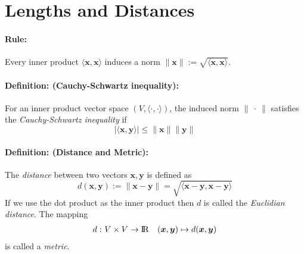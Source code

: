 \documentclass[12pt]{article}
\newcommand{\R}{{\rm I\!R}}
\newcommand{\bx}{{\bm{x}}}
\newcommand{\by}{{\bm{y}}}
\newcommand{\0}[0]{\bm{0}}
\newcommand{\ipr}[1]{\langle #1 \rangle}
\newcommand{\norm}[1]{\lVert#1\rVert}
\newcommand{\xdefinition}[2]{\paragraph{\colorbox{#1!30}{\textbf{Definition:}} (#2):}}
\newcommand{\xrule}[1]{\paragraph{\colorbox{#1!30}{\textbf{Rule:}}}}
\begin{document}
\section{Lengths and Distances}

\xrule{red} Every inner product $\ipr{\bx, \bx}$ induces a norm $\norm{\bx} := \sqrt{\ipr{\bx, \bx}}$.

\xdefinition{red}{Cauchy-Schwartz inequality} For an inner product vector space $(V, \ipr{\cdot, \cdot})$, the induced norm $\norm{\ \cdot \ }$ satisfies the \textit{Cauchy-Schwartz inequality} if
%
\begin{equation}
	| \ipr{\bx, \by} | \leqslant \norm{\bx} \norm{\by}
\end{equation}

\xdefinition{red}{Distance and Metric} The \textit{distance} between two vectors $\bx, \by$ is defined as
%
\begin{equation}
	d(\bx, \by) := \norm{\bx - \by} = \sqrt{\ipr{\bx - \by, \bx - \by}}
\end{equation}
%
If we use the dot product as the inner product then $d$ is called the \textit{Euclidian distance}. The mapping
%
\begin{equation}
\begin{aligned}
	d : \ &V \times V \rightarrow \R
	      &(\bx, \by) \mapsto d(\bx, \by)
\end{aligned}
\end{equation}
%
is called a \textit{metric}.
\end{document}
